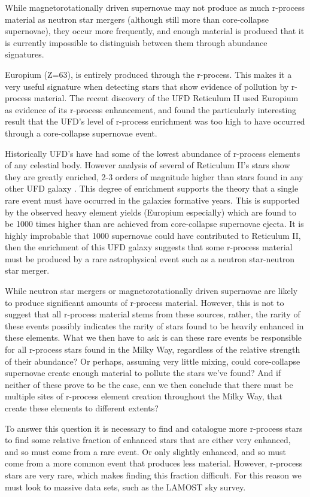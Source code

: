 \documentclass[a4paper,fleqn,usenatbib]{mnras}
\begin{document}
	While magnetorotationally driven supernovae may not produce as much r-process material as neutron star mergers (although still more than core-collapse supernovae), they occur more frequently, and enough material is produced that it is currently impossible to distinguish between them through abundance signatures.
	
	Europium (Z=63), is entirely produced through the r-process. This makes it a very useful signature when detecting stars that show evidence of pollution by r-process material. The recent discovery of the UFD Reticulum II used Europium as evidence of its r-process enhancement, and found the particularly interesting result that the UFD's level of r-process enrichment was too high to have occurred through a core-collapse supernovae event.

	Historically UFD's have had some of the lowest abundance of r-process elements of any celestial body. However analysis of several of Reticulum II's stars show they are greatly enriched, 2-3 orders of magnitude higher than stars found in any other UFD galaxy \citep{Ji2016}. This degree of enrichment supports the theory that a single rare event must have occurred in the galaxies formative years. This is supported by the observed heavy element yields (Europium especially) which are found to be 1000 times higher than are achieved from core-collapse supernovae ejecta. It is highly improbable that 1000 supernovae could have contributed to Reticulum II, then the enrichment of this UFD galaxy suggests that some r-process material must be produced by a rare astrophysical event such as a neutron star-neutron star merger.
	
	While neutron star mergers or magnetorotationally driven supernovae are likely to produce significant amounts of r-process material. However, this is not to suggest that all r-process material stems from these sources, rather, the rarity of these events possibly indicates the rarity of stars found to be heavily enhanced in these elements. What we then have to ask is can these rare events be responsible for all r-process stars found in the Milky Way, regardless of the relative strength of their abundance? Or perhaps, assuming very little mixing, could core-collapse supernovae create enough material to pollute the stars we've found? And if neither of these prove to be the case, can we then conclude that there must be multiple sites of r-process element creation throughout the Milky Way, that create these elements to different extents?
	
	To answer this question it is necessary to find and catalogue more r-process stars to find some relative fraction of enhanced stars that are either very enhanced, and so must come from a rare event. Or only slightly enhanced, and so must come from a more common event that produces less material. However, r-process stars are very rare, which makes finding this fraction difficult. For this reason we must look to massive data sets, such as the LAMOST sky survey.
	
\end{document}
